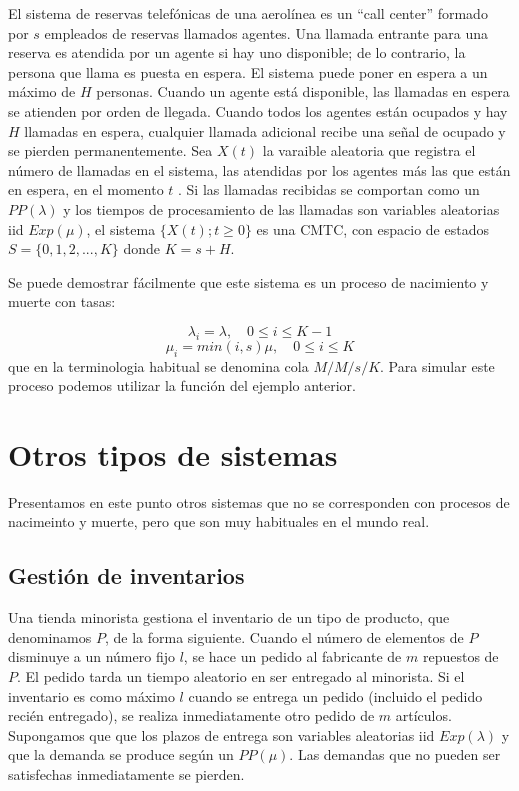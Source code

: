 \documentclass[
]{book}
\theoremstyle{definition}
\theoremstyle{definition}
\theoremstyle{definition}
\theoremstyle{definition}
\theoremstyle{remark}
\begin{document}
El sistema de reservas telefónicas de una aerolínea es un ``call center'' formado por \(s\) empleados de reservas llamados agentes. Una llamada entrante para una reserva es atendida por un agente si hay uno disponible; de lo contrario, la persona que llama es puesta en espera. El sistema puede poner en espera a un máximo de \(H\) personas. Cuando un agente está disponible, las llamadas en espera se atienden por orden de llegada. Cuando todos los agentes están ocupados y hay \(H\) llamadas en espera, cualquier llamada adicional recibe una señal de ocupado y se pierden permanentemente. Sea \(X(t)\) la varaible aleatoria que registra el número de llamadas en el sistema, las atendidas por los agentes más las que están en espera, en el momento \(t\) . Si las llamadas recibidas se comportan como un \(PP(\lambda)\) y los tiempos de procesamiento de las llamadas son variables aleatorias iid \(Exp(\mu)\), el sistema \(\{X(t); t \geq 0\}\) es una CMTC, con espacio de estados \(S = \{0, 1, 2,...,K\}\) donde \(K = s + H\).

Se puede demostrar fácilmente que este sistema es un proceso de nacimiento y muerte con tasas:

\[\lambda_i = \lambda, \quad 0 \leq i \leq K-1\] \[\mu_i = min(i, s)\mu, \quad 0 \leq i \leq K\] que en la terminologia habitual se denomina cola \(M/M/s/K\). Para simular este proceso podemos utilizar la función del ejemplo anterior.

\hypertarget{CMTCE}{%
\section{Otros tipos de sistemas}\label{CMTCE}}

Presentamos en este punto otros sistemas que no se corresponden con procesos de nacimeinto y muerte, pero que son muy habituales en el mundo real.

\hypertarget{gestiuxf3n-de-inventarios}{%
\subsection{Gestión de inventarios}\label{gestiuxf3n-de-inventarios}}

Una tienda minorista gestiona el inventario de un tipo de producto, que denominamos \(P\), de la forma siguiente. Cuando el número de elementos de \(P\) disminuye a un número fijo \(l\), se hace un pedido al fabricante de \(m\) repuestos de \(P\). El pedido tarda un tiempo aleatorio en ser entregado al minorista. Si el inventario es como máximo \(l\) cuando se entrega un pedido (incluido el pedido recién entregado), se realiza inmediatamente otro pedido de \(m\) artículos. Supongamos que que los plazos de entrega son variables aleatorias iid \(Exp(\lambda)\) y que la demanda se produce según un \(PP(\mu)\). Las demandas que no pueden ser satisfechas inmediatamente se pierden.
\end{document}
